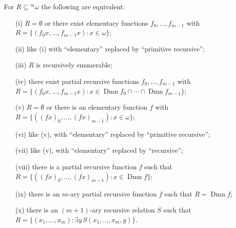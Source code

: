 For $R \subseteq {}^m \omega$ the following are equivalent:

\begin{enumerate}
\item[(i)] $R = \emptyset$ or there exist elementary functions $f_0, \ldots, f_{m-1}$ with $R = \{(f_0 x, \ldots, f_{m-1} x) : x \in \omega\}$;
\item[(ii)] like (i) with ``elementary'' replaced by ``primitive recursive'';
\item[(iii)] $R$ is recursively enumerable;
\item[(iv)] there exist partial recursive functions $f_0, \ldots, f_{m-1}$ with $R = \{(f_0 x, \ldots, f_{m-1} x) : x \in \operatorname{Dmn} f_0 \cap \cdots \cap \operatorname{Dmn} f_{m-1}\}$;
\item[(v)] $R = \emptyset$ or there is an elementary function $f$ with $R = \{((f x)_0, \ldots, (f x)_{m-1}) : x \in \omega\}$;
\item[(vi)] like (v), with ``elementary'' replaced by ``primitive recursive'';
\item[(vii)] like (v), with ``elementary'' replaced by ``recursive'';
\item[(viii)] there is a partial recursive function $f$ such that $R = \{((f x)_0, \ldots, (f x)_{m-1}) : x \in \operatorname{Dmn} f\}$;
\item[(ix)] there is an $m$-ary partial recursive function $f$ such that $R = \operatorname{Dmn} f$;
\item[(x)] there is an $(m+1)$-ary recursive relation $S$ such that $R = \{(x_1, \ldots, x_m) : \exists y \, S(x_1, \ldots, x_m, y)\}$.
\end{enumerate}
